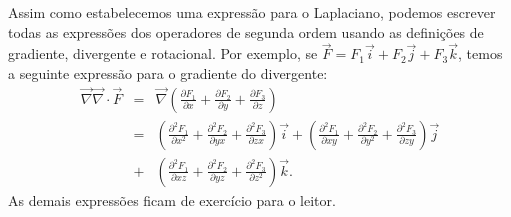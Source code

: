 Assim como estabelecemos uma expressão para o Laplaciano, podemos escrever todas as expressões dos operadores de segunda ordem usando as definições de gradiente, divergente e rotacional. Por exemplo, se $\vec{F}=F_1\vec{i}+F_2\vec{j}+F_3\vec{k}$, temos a seguinte expressão para o gradiente do divergente:
\begin{eqnarray*}
\vec{\nabla} \vec{\nabla} \cdot \vec{F}&=& \vec{\nabla} \left(\frac{\partial F_1}{\partial x}+\frac{\partial F_2}{\partial y}+\frac{\partial F_3}{\partial z}\right)\\
&=&\left(\frac{\partial^2 F_1}{\partial x^2}+\frac{\partial^2 F_2}{\partial yx}+\frac{\partial^2 F_3}{\partial zx}\right)\vec{i}+\left(\frac{\partial^2 F_1}{\partial xy}+\frac{\partial^2 F_2}{\partial y^2}+\frac{\partial^2 F_3}{\partial zy}\right)\vec{j}\\&+&\left(\frac{\partial^2 F_1}{\partial xz}+\frac{\partial^2 F_2}{\partial yz}+\frac{\partial^2 F_3}{\partial z^2}\right)\vec{k}.
\end{eqnarray*}
As demais expressões ficam de exercício para o leitor.


